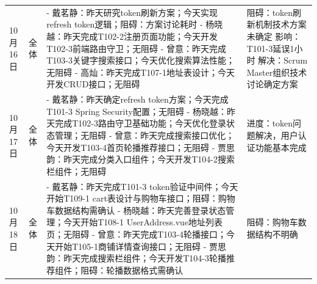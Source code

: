 \begin{levellist}
\begin{longtable}{>{\centering\arraybackslash}m{1cm} >{\centering\arraybackslash}m{1cm} >{\centering\arraybackslash}m{8.5cm} >{\centering\arraybackslash}m{3cm}}
        10月16日                                              & 全体                                                                               & - 戴茗静：昨天研究token刷新方案；今天实现refresh token逻辑；阻碍：方案讨论耗时 \newline
        - 杨晓越：昨天完成T102-2注册页面功能；今天开发T102-3前端路由守卫；无阻碍 \newline
        - 曾意：昨天完成T103-3关键字搜索接口；今天优化搜索算法性能；无阻碍 \newline
        - 高灿：昨天完成T107-1地址表设计；今天开发CRUD接口；无阻碍                 & 阻碍：token刷新机制技术方案未确定 \newline
        影响：T101-3延误1小时 \newline
        解决：Scrum Master组织技术讨论确定方案                                                                                                                                                                                                                        \\
        10月17日                                              & 全体                                                                               & - 戴茗静：昨天确定refresh token方案；今天完成T101-3 Spring Security配置；无阻碍 \newline
        - 杨晓越：昨天完成T102-3路由守卫基础功能；今天优化登录状态管理；无阻碍 \newline
        - 曾意：昨天完成搜索接口优化；今天开发T103-4首页轮播推荐接口；无阻碍 \newline
        - 贾思韵：昨天完成分类入口组件；今天开发T104-2搜索栏组件；无阻碍                & 进度：token问题解决，用户认证功能基本完成                                                                                                                                                                    \\
        10月18日                                              & 全体                                                                               & - 戴茗静：昨天完成T101-3 token验证中间件；今天开始T109-1 cart表设计与购物车接口；阻碍：购物车数据结构需确认 \newline
        - 杨晓越：昨天完善登录状态管理；今天开始T108-1 UserAddress.vue地址列表页；无阻碍 \newline
        - 曾意：昨天完成T103-4轮播接口；今天开始T105-1商铺详情查询接口；无阻碍 \newline
        - 贾思韵：昨天完成搜索栏组件；今天开发T104-3轮播推荐组件；阻碍：轮播数据格式需确认       & 阻碍：购物车数据结构不明确 \newline

\end{longtable}
\end{levellist}
